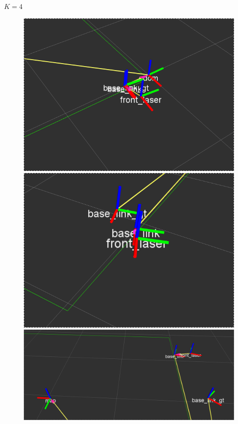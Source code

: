 \pagebreak
$K = 4$


\begin{figure}[!htb]
  \includegraphics[width=\linewidth]{imagenesExpLazoCerrado/k4/1.png}
\endminipage\hfill
{}
  \includegraphics[width=\linewidth]{imagenesExpLazoCerrado/k4/2.png}
\endminipage\hfill
{}%
  \includegraphics[width=\linewidth]{imagenesExpLazoCerrado/k4/4.png}
\endminipage
\end{figure}

